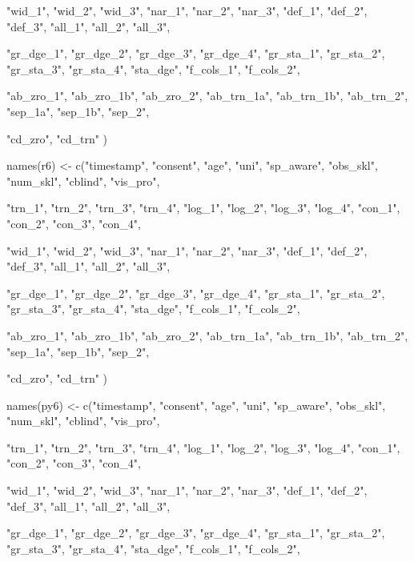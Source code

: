 \documentclass{article}
\begin{document}
                 "wid_1", "wid_2", "wid_3",
                 "nar_1", "nar_2", "nar_3", 
                 "def_1", "def_2", "def_3", 
                 "all_1", "all_2", "all_3",
  
                 "gr_dge_1", "gr_dge_2", "gr_dge_3", "gr_dge_4",
                 "gr_sta_1", "gr_sta_2", "gr_sta_3", "gr_sta_4", 
                 "sta_dge",
                 "f_cols_1", "f_cols_2", 
  
                 "ab_zro_1", "ab_zro_1b", "ab_zro_2",
                 "ab_trn_1a", "ab_trn_1b", "ab_trn_2", 
                 "sep_1a", "sep_1b", "sep_2",
                 
                 "cd_zro",
                 "cd_trn"
                 )
                 
names(r6) <- c("timestamp", "consent", "age", "uni", "sp_aware", "obs_skl", "num_skl", "cblind", "vis_pro",
                 
                 "trn_1", "trn_2", "trn_3", "trn_4",
                 "log_1", "log_2", "log_3", "log_4", 
                 "con_1", "con_2", "con_3", "con_4",
                 
                 "wid_1", "wid_2", "wid_3",
                 "nar_1", "nar_2", "nar_3", 
                 "def_1", "def_2", "def_3", 
                 "all_1", "all_2", "all_3",
  
                 "gr_dge_1", "gr_dge_2", "gr_dge_3", "gr_dge_4",
                 "gr_sta_1", "gr_sta_2", "gr_sta_3", "gr_sta_4", 
                 "sta_dge",
                 "f_cols_1", "f_cols_2", 
  
                 "ab_zro_1", "ab_zro_1b", "ab_zro_2",
                 "ab_trn_1a", "ab_trn_1b", "ab_trn_2", 
                 "sep_1a", "sep_1b", "sep_2",
                 
                 "cd_zro",
                 "cd_trn"
                 )

names(py6) <- c("timestamp", "consent", "age", "uni", "sp_aware", "obs_skl", "num_skl", "cblind", "vis_pro",
                 
                 "trn_1", "trn_2", "trn_3", "trn_4",
                 "log_1", "log_2", "log_3", "log_4", 
                 "con_1", "con_2", "con_3", "con_4",
                 
                 "wid_1", "wid_2", "wid_3",
                 "nar_1", "nar_2", "nar_3", 
                 "def_1", "def_2", "def_3", 
                 "all_1", "all_2", "all_3",
  
                 "gr_dge_1", "gr_dge_2", "gr_dge_3", "gr_dge_4",
                 "gr_sta_1", "gr_sta_2", "gr_sta_3", "gr_sta_4", 
                 "sta_dge",
                 "f_cols_1", "f_cols_2", 
  
\end{document}
